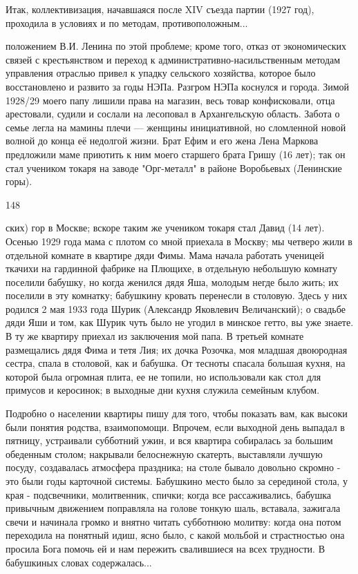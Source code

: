 Итак, коллективизация, начавшаяся после XIV съезда партии (1927 год), проходила в условиях и по методам, противоположным...

положением В.И. Ленина по этой проблеме; кроме того, отказ от экономических связей с крестьянством и переход к административно-насильственным методам управления отраслью привел к упадку сельского хозяйства, которое было восстановлено и развито за годы НЭПа. Разгром НЭПа коснулся и города. Зимой 1928/29 моего папу лишили права на магазин, весь товар конфисковали, отца арестовали, судили и сослали на лесоповал в Архангельскую область. Забота о семье легла на мамины плечи — женщины инициативной, но сломленной новой волной до конца её недолгой жизни. Брат Ефим и его жена Лена Маркова предложили маме приютить к ним моего старшего брата Гришу (16 лет); так он стал учеником токаря на заводе "Орг-металл" в районе Воробьевых (Ленинские горы).

148

ских) гор в Москве; вскоре таким же учеником токаря стал Давид (14 лет). Осенью 1929 года мама с плотом со мной приехала в Москву; мы четверо жили в отдельной комнате в квартире дяди Фимы. Мама начала работать ученицей ткачихи на гардинной фабрике на Плющихе, в отдельную небольшую комнату поселили бабушку, но когда женился дядя Яша, молодым негде было жить; их поселили в эту комнатку; бабушкину кровать перенесли в столовую. Здесь у них родился 2 мая 1933 года Шурик (Александр Яковлевич Величанский); о свадьбе дяди Яши и том, как Шурик чуть было не угодил в минское гетто, вы уже знаете. В ту же квартиру приехал из заключения мой папа. В третьей комнате размещались дядя Фима и тетя Лия; их дочка Розочка, моя младшая двоюродная сестра, спала в столовой, как и бабушка. От тесноты спасала большая кухня, на которой была огромная плита, ее не топили, но использовали как стол для примусов и керосинок; в выходные дни кухня служила семейным клубом.

Подробно о населении квартиры пишу для того, чтобы показать вам, как высоки были понятия родства, взаимопомощи. Впрочем, если выходной день выпадал в пятницу, устраивали субботний ужин, и вся квартира собиралась за большим обеденным столом; накрывали белоснежную скатерть, выставляли лучшую посуду, создавалась атмосфера праздника; на столе бывало довольно скромно - это были годы карточной системы. Бабушкино место было за серединой стола, у края - подсвечники, молитвенник, спички; когда все рассаживались, бабушка привычным движением поправляла на голове тонкую шаль, вставала, зажигала свечи и начинала громко и внятно читать субботнюю молитву: когда она потом переходила на понятный идиш, ясно было, с какой мольбой и страстностью она просила Бога помочь ей и нам пережить свалившиеся на всех трудности. В бабушкиных словах содержалась...

